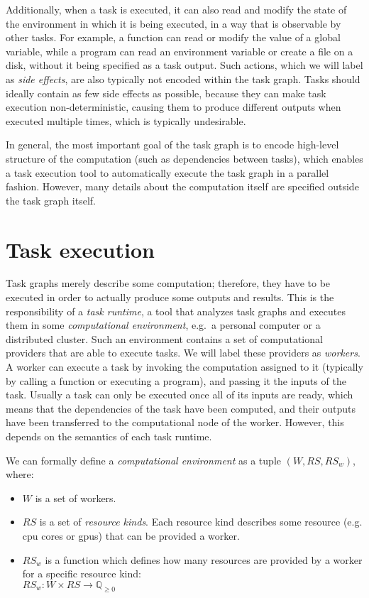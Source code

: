 Additionally, when a task is executed, it can also read and modify the state of the environment in
which it is being executed, in a way that is observable by other tasks. For example, a function can
read or modify the value of a global variable, while a program can read an environment variable or
create a file on a disk, without it being specified as a task output. Such actions, which we will
label as \emph{side effects}, are also typically not encoded within the task graph. Tasks should
ideally contain as few side effects as possible, because they can make task execution
non-deterministic, causing them to produce different outputs when executed multiple times, which is
typically undesirable.

In general, the most important goal of the task graph is to encode high-level structure of the
computation (such as dependencies between tasks), which enables a task execution tool to
automatically execute the task graph in a parallel fashion. However, many details about the
computation itself are specified outside the task graph itself.

\section{Task execution}
Task graphs merely describe some computation; therefore, they have to be executed in order to
actually produce some outputs and results. This is the responsibility of a \emph{task runtime},
a tool that analyzes task graphs and executes them in some \emph{computational environment}, e.g.\ a personal
computer or a distributed cluster. Such an environment contains a set of computational providers
that are able to execute tasks. We will label these providers as \emph{workers}. A worker
can execute a task by invoking the computation assigned to it (typically by calling a function or
executing a program), and passing it the inputs of the task. Usually a task can only be executed
once all of its inputs are ready, which means that the dependencies of the task have been computed,
and their outputs have been transferred to the computational node of the worker. However, this
depends on the semantics of each task runtime.

We can formally define a \emph{computational environment} as a tuple $(W, RS, RS_w)$, where:
\begin{itemize}[itemsep=0pt]
	\item $W$ is a set of workers.
	\item $RS$ is a set of \emph{resource kinds}. Each resource kind describes some
	      resource (e.g. \gls{cpu} cores or \glspl{gpu})
	      that can be provided a worker.
	\item $RS_w$ is a function which defines how many resources are provided by a
	      worker for a specific resource kind: \\ $RS_w\colon W \times RS \rightarrow \mathbb{Q}_{\geq{}0}$
\end{itemize}

